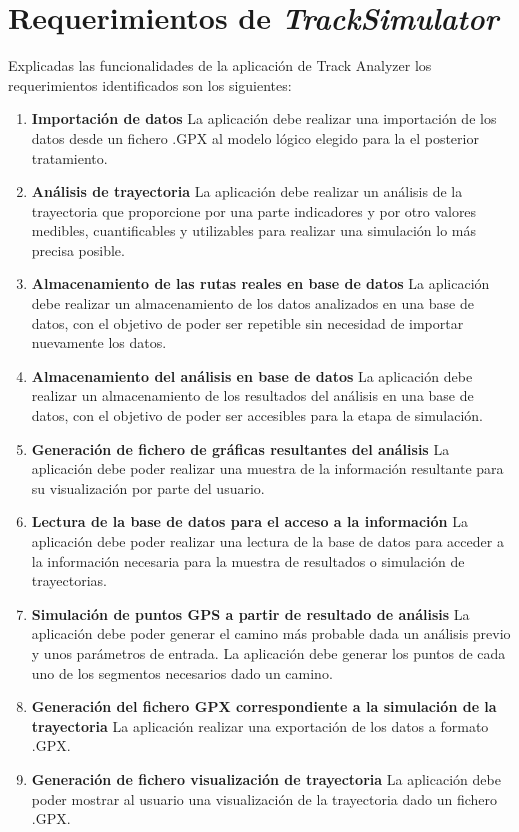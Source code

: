 \section{Requerimientos de \textit{TrackSimulator}} \label{section: RequerimientosTrackSimulator}
Explicadas las funcionalidades de la aplicación de Track Analyzer los requerimientos identificados son los siguientes:
\begin{enumerate}[label={R.\arabic*.}]

\item \textbf{Importación de datos} La aplicación debe realizar una importación de los datos desde un fichero .\ac{GPX} al modelo lógico elegido para la el posterior tratamiento.

\item \textbf{Análisis de trayectoria} La aplicación debe realizar un análisis de la trayectoria que proporcione por una parte indicadores y por otro valores medibles, cuantificables y utilizables para realizar una simulación 
lo más precisa posible.

\item \textbf{Almacenamiento de las rutas reales en base de datos} La aplicación debe realizar un almacenamiento de los datos analizados en una base de datos, con el objetivo de poder ser repetible
sin necesidad de importar nuevamente los datos.

\item \textbf{Almacenamiento del análisis en base de datos} La aplicación debe realizar un almacenamiento de los resultados del análisis en una base de datos, con el objetivo de poder ser accesibles para la
etapa de simulación.

\item \textbf{Generación de fichero de gráficas resultantes del análisis}  La aplicación debe poder realizar una muestra de la información resultante para su visualización por parte del usuario.

\item \textbf{Lectura de la base de datos para el acceso a la información} La aplicación debe poder realizar una lectura de la base de datos para acceder a la información necesaria para la muestra de resultados o 
simulación de trayectorias.

\item \textbf{Simulación de puntos \ac{GPS} a partir de resultado de análisis} La aplicación debe poder generar el camino más probable dada un análisis previo y unos parámetros de entrada. La aplicación debe generar los puntos de cada uno de los segmentos necesarios dado un camino.

\item \textbf{Generación del fichero GPX correspondiente a la simulación de la trayectoria}  La aplicación realizar una exportación de los datos a formato .\ac{GPX}.

\item \textbf{Generación de fichero visualización de trayectoria}  La aplicación debe poder mostrar al usuario una visualización de la trayectoria dado un fichero .\ac{GPX}.

\end{enumerate}

